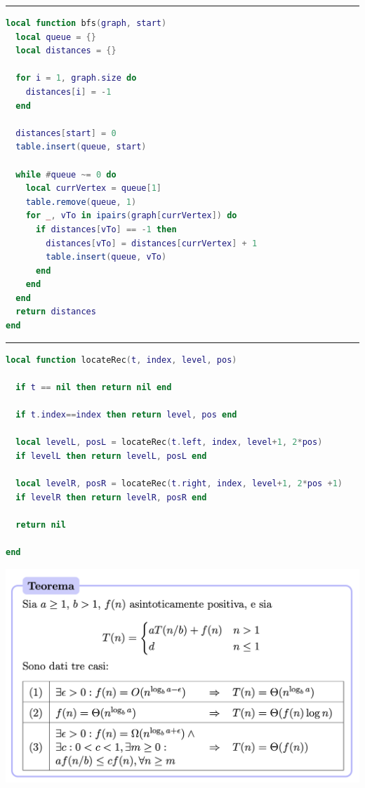 \vskip3mm
\hrule
\begin{center}
  \begin{lstlisting}[language = lua, frame = none, numbers = none]
  local function bfs(graph, start)
  local queue = {}
  local distances = {}

  for i = 1, graph.size do
    distances[i] = -1
  end

  distances[start] = 0
  table.insert(queue, start)

  while #queue ~= 0 do
    local currVertex = queue[1]
    table.remove(queue, 1)
    for _, vTo in ipairs(graph[currVertex]) do
      if distances[vTo] == -1 then
        distances[vTo] = distances[currVertex] + 1
        table.insert(queue, vTo)
      end
    end
  end
  return distances
end
\end{lstlisting} 
\end{center}
\hrule
\begin{center}
\begin{lstlisting}[language = lua, frame = none, numbers = none]
local function locateRec(t, index, level, pos)

  if t == nil then return nil end

  if t.index==index then return level, pos end

  local levelL, posL = locateRec(t.left, index, level+1, 2*pos)
  if levelL then return levelL, posL end

  local levelR, posR = locateRec(t.right, index, level+1, 2*pos +1)
  if levelR then return levelR, posR end

  return nil

end
  \end{lstlisting} 
\end{center}
\begin{center}
  \includegraphics[width=\textwidth]{images/MASTER.png }
\end{center}



